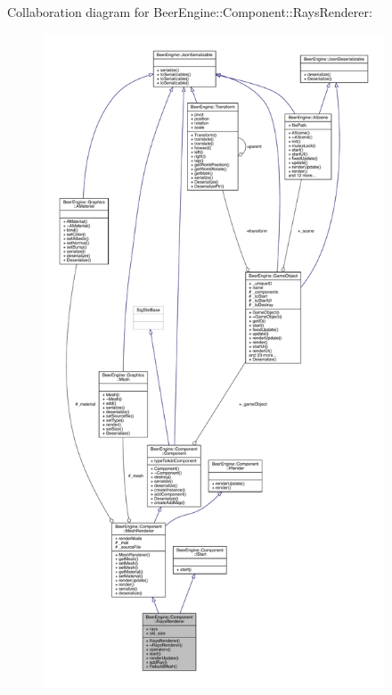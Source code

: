 Collaboration diagram for Beer\+Engine\+:\+:Component\+:\+:Rays\+Renderer\+:
\nopagebreak
\begin{figure}[H]
\begin{center}
\leavevmode
\includegraphics[height=550pt]{class_beer_engine_1_1_component_1_1_rays_renderer__coll__graph}
\end{center}
\end{figure}
